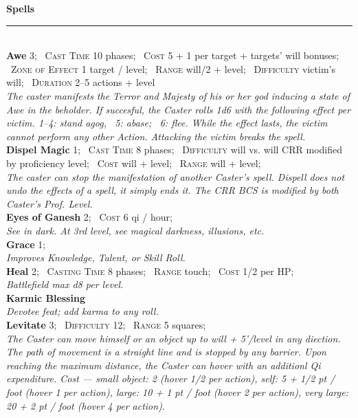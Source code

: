 \documentclass[11pt]{article}
\newcommand{\spell}[1]{{\sc\bfseries\large #1}}
\begin{document}
\clearpage
\noindent
{\sc\bfseries\Large Spells}
\vspace*{4pt}
\hrule
%
\mbox{ }
\\[12pt]
%
\spell{Awe} 3;
\ \textsc{Cast Time} 10 phases;
\ \textsc{Cost} 5 + 1 per target + targets' will bonuses;
\ \textsc{Zone of Effect} 1 target / level;
\ \textsc{Range} will/2 + level;
\ \textsc{Difficulty} victim's will;
\ \textsc{Duration} 2--5 actions + level
\\
\textsl{The caster manifests the Terror and Majesty of his or her god inducing
a state of Awe in the beholder.  If succesful, the Caster rolls 1d6
with the following effect per victim.  1--4: stand agog, \, 5: abase;
\, 6: flee.  While the effect lasts, the victim cannot perform any
other Action.  Attacking the victim breaks the spell.}
%
\\[4pt]
%
\spell{Dispel Magic} 1;
\ \textsc{Cast Time} 8 phases;
\ \textsc{Difficulty} will vs. will CRR modified by proficiency level;
\ \textsc{Cost} will + level;
\ \textsc{Range} will + level;
\\
\textsl{The caster can stop the manifestation of another Caster's
  spell.  Dispell does not undo the effects of a spell, it simply ends
  it.  The CRR BCS is modified by both Caster's Prof. Level.}
%
\\[4pt]
%
\spell{Eyes of Ganesh} 2;
\ \textsc{Cost} 6 qi / hour;
\\
\textsl{See in dark.  At 3rd level, see magical darkness, illusions, etc.}
%
\\[4pt]
%
\spell{Grace} 1;
\\
\textsl{Improves Knowledge, Talent, or Skill Roll.}
%
\\[4pt]
%
\spell{Heal} 2;
\ \textsc{Casting Time} 8 phases;
\ \textsc{Range} touch;
\ \textsc{Cost} 1/2 per HP;
\\
\textsl{Battlefield max d8 per level.}
%
\\[4pt]
%
\spell{Karmic Blessing}
%
\\
\textsl{Devotee feat;  add karma to any roll.}
%
\\[4pt]
\spell{Levitate} 3; \ \textsc{Difficulty} 12; \ \textsc{Range} 5
squares;
\\
\textsl{The Caster can move himself or an object up to will + 5'/level
  in any diection.  The path of movement is a straight line and is
  stopped by any barrier.  Upon reaching the maximum distance, the
  Caster can hover with an additionl Qi expenditure.  Cost ---
  small object: 2 (hover 1/2 per action), self: 5 + 1/2 pt / foot
  (hover 1 per action), large: 10 + 1 pt / foot (hover 2 per action),
  very large: 20 + 2 pt / foot (hover 4 per action).}
\end{document}
